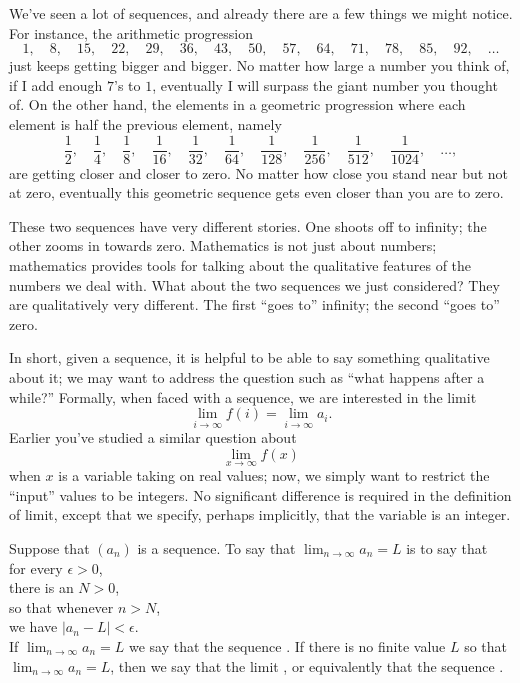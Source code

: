 \documentclass{ximera}
\begin{document}
We've seen a lot of sequences, and already there are a few things we
might notice.  For instance, the arithmetic progression
\[
1,\quad 8,\quad 15,\quad 22,\quad 29,\quad 36,\quad 43,\quad 50,\quad 57,\quad 64,\quad 71,\quad 78,\quad 85,\quad 92,\quad \ldots
\]
just keeps getting bigger and bigger.  No matter how large a number
you think of, if I add enough $7$'s to $1$, eventually I will surpass
the giant number you thought of.  On the other hand, the elements in a
geometric progression where each element is half the previous element,
namely
\[
\frac{1}{2},\quad \frac{1}{4},\quad \frac{1}{8},\quad \frac{1}{16},\quad \frac{1}{32},\quad \frac{1}{64},\quad \frac{1}{128},\quad \frac{1}{256},\quad \frac{1}{512},\quad \frac{1}{1024},\quad \ldots ,
\]
are getting closer and closer to zero.  No matter how close you stand
near but not at zero, eventually this geometric sequence gets even
closer than you are to zero.


These two sequences have very different stories.  One shoots off to
infinity; the other zooms in towards zero.  Mathematics is not just
about numbers; mathematics provides tools for talking about the
qualitative features of the numbers we deal with.  What about the two
sequences we just considered?  They are qualitatively very different.
The first ``goes to'' infinity; the second ``goes to'' zero.

In short, given a sequence, it is helpful to be able to say something
qualitative about it; we may want to address the question such as
``what happens after a while?'' Formally, when faced with a sequence,
we are interested in the limit
\[
\lim_{i\to \infty} f(i) = \lim_{i\to\infty} a_i.
\]
Earlier you've studied a similar question about
\[
\lim_{x\to\infty} f(x)
\]
when $x$ is a variable taking on real values; now, we simply want to
restrict the ``input'' values to be integers. No significant
difference is required in the definition of limit, except that we
specify, perhaps implicitly, that the variable is an integer.

\begin{definition}
\label{definition:limit-of-a-sequence}
Suppose that $\left(a_n\right)$ is a sequence.
To say that $\lim_{n\to \infty}a_n=L$ is to say that \\
\null\quad for every $\epsilon>0$, \\
\null\quad\quad there is an $N > 0$, \\
\null\quad so that whenever $n>N$, \\
\null\quad\quad we have $|a_n-L|<\epsilon$. \\
If $\lim_{n\to\infty}a_n=L$ we say that the sequence
.  If there is no finite value $L$ so
that $\lim_{n\to\infty}a_n = L$, then we say that the limit
, or equivalently that the sequence
.
\end{definition} 
\end{document}
